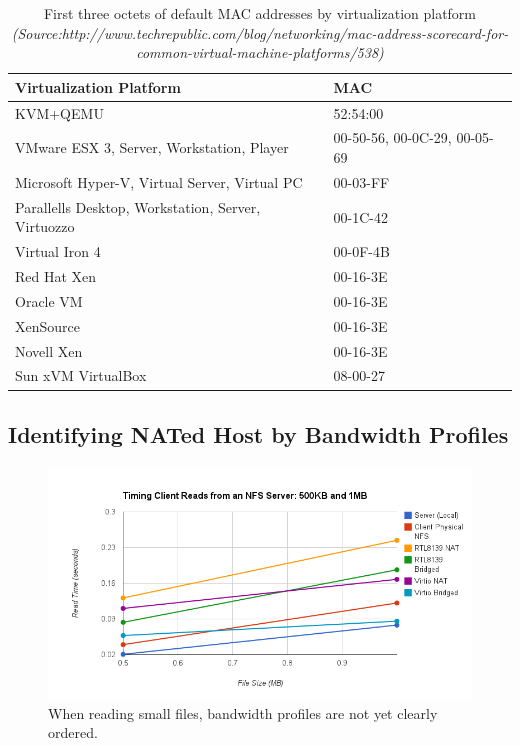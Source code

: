 \documentclass[letterpaper,twocolumn,11pt]{article}
\begin{document}
\begin{table}[htb]
		\centering
		\begin{tabular}{|l|l|}
		\hline
			Virtualization Platform & MAC \\
		\hline
		\hline
			KVM+QEMU & 52:54:00 \\
			VMware ESX 3, Server, Workstation, Player	& 00-50-56, 00-0C-29, 00-05-69 \\
			Microsoft Hyper-V, Virtual Server, Virtual PC	& 00-03-FF \\
			Parallells Desktop, Workstation, Server, Virtuozzo & 00-1C-42 \\
			Virtual Iron 4 & 00-0F-4B \\
			Red Hat Xen	& 00-16-3E \\
			Oracle VM	& 00-16-3E \\
			XenSource	& 00-16-3E \\
			Novell Xen & 00-16-3E \\
			Sun xVM VirtualBox & 08-00-27 \\
		\hline
		\end{tabular}
	\caption{First three octets of default MAC addresses by virtualization platform \emph{(Source:http://www.techrepublic.com/blog/networking/mac-address-scorecard-for-common-virtual-machine-platforms/538)}}
	\label{tab:macaddrs}
\end{table}


\subsection{Identifying NATed Host by Bandwidth Profiles}
\label{subsec:BWprofiles}	

\begin{figure}[htb]
		\includegraphics[scale=0.34]{timing_small.png}
	\caption{When reading small files, bandwidth profiles are not yet clearly ordered.}
	\label{fig:timing_small}
\end{figure}
\end{document}
